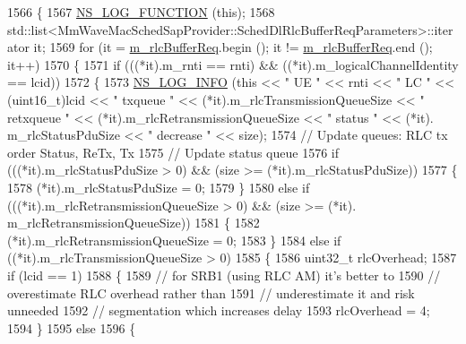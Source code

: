 \begin{DoxyCode}
1566 \{
1567   \hyperlink{log-macros-disabled_8h_a90b90d5bad1f39cb1b64923ea94c0761}{NS\_LOG\_FUNCTION} (\textcolor{keyword}{this});
1568   std::list<MmWaveMacSchedSapProvider::SchedDlRlcBufferReqParameters>::iterator it;
1569   \textcolor{keywordflow}{for} (it = \hyperlink{classns3_1_1MmWaveFlexTtiMaxRateMacScheduler_a44dc80f8ce69475652e67f365c55196f}{m\_rlcBufferReq}.begin (); it != \hyperlink{classns3_1_1MmWaveFlexTtiMaxRateMacScheduler_a44dc80f8ce69475652e67f365c55196f}{m\_rlcBufferReq}.end (); it++)
1570     \{
1571       \textcolor{keywordflow}{if} (((*it).m\_rnti == rnti) && ((*it).m\_logicalChannelIdentity == lcid))
1572         \{
1573           \hyperlink{group__logging_gafbd73ee2cf9f26b319f49086d8e860fb}{NS\_LOG\_INFO} (\textcolor{keyword}{this} << \textcolor{stringliteral}{" UE "} << rnti << \textcolor{stringliteral}{" LC "} << (uint16\_t)lcid << \textcolor{stringliteral}{" txqueue "} << 
      (*it).m\_rlcTransmissionQueueSize << \textcolor{stringliteral}{" retxqueue "} << (*it).m\_rlcRetransmissionQueueSize << \textcolor{stringliteral}{" status "} << (*it).
      m\_rlcStatusPduSize << \textcolor{stringliteral}{" decrease "} << size);
1574           \textcolor{comment}{// Update queues: RLC tx order Status, ReTx, Tx}
1575           \textcolor{comment}{// Update status queue}
1576            \textcolor{keywordflow}{if} (((*it).m\_rlcStatusPduSize > 0) && (size >= (*it).m\_rlcStatusPduSize))
1577               \{
1578                 (*it).m\_rlcStatusPduSize = 0;
1579               \}
1580             \textcolor{keywordflow}{else} \textcolor{keywordflow}{if} (((*it).m\_rlcRetransmissionQueueSize > 0) && (size >= (*it).
      m\_rlcRetransmissionQueueSize))
1581               \{
1582                 (*it).m\_rlcRetransmissionQueueSize = 0;
1583               \}
1584             \textcolor{keywordflow}{else} \textcolor{keywordflow}{if} ((*it).m\_rlcTransmissionQueueSize > 0)
1585               \{
1586                 uint32\_t rlcOverhead;
1587                 \textcolor{keywordflow}{if} (lcid == 1)
1588                   \{
1589                     \textcolor{comment}{// for SRB1 (using RLC AM) it's better to}
1590                     \textcolor{comment}{// overestimate RLC overhead rather than}
1591                     \textcolor{comment}{// underestimate it and risk unneeded}
1592                     \textcolor{comment}{// segmentation which increases delay}
1593                     rlcOverhead = 4;
1594                   \}
1595                 \textcolor{keywordflow}{else}
1596                   \{

\end{DoxyCode}
